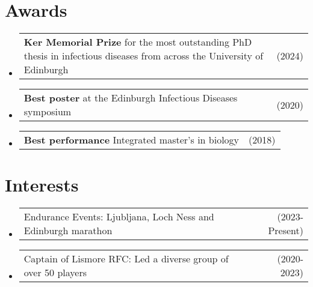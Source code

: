 \documentclass[a4paper,11pt]{article}
\begin{document}
\section{Awards}
\begin{itemize}[leftmargin=1.2em, itemsep=3pt, label=-]
\item \begin{tabularx}{\linewidth}{@{}X r@{}}
\textbf{Ker Memorial Prize} for the most outstanding PhD thesis in infectious diseases from across the University of Edinburgh & (2024) \\
\end{tabularx}
\item \begin{tabularx}{\linewidth}{@{}X r@{}}
\textbf{Best poster} at the Edinburgh Infectious Diseases symposium & (2020) \\
\end{tabularx}
\item \begin{tabularx}{\linewidth}{@{}X r@{}}
\textbf{Best performance} Integrated master's in biology & (2018) \\
\end{tabularx}
\end{itemize}

\section{Interests}
\begin{itemize}[leftmargin=1.2em, itemsep=3pt, label=-]
\item \begin{tabularx}{\linewidth}{@{}X r@{}}
Endurance Events: Ljubljana, Loch Ness and Edinburgh marathon & (2023-Present) \\
\end{tabularx}
\item \begin{tabularx}{\linewidth}{@{}X r@{}}
Captain of Lismore RFC: Led a diverse group of over 50 players & (2020-2023) \\
\end{tabularx}
\end{itemize}
\end{document}
